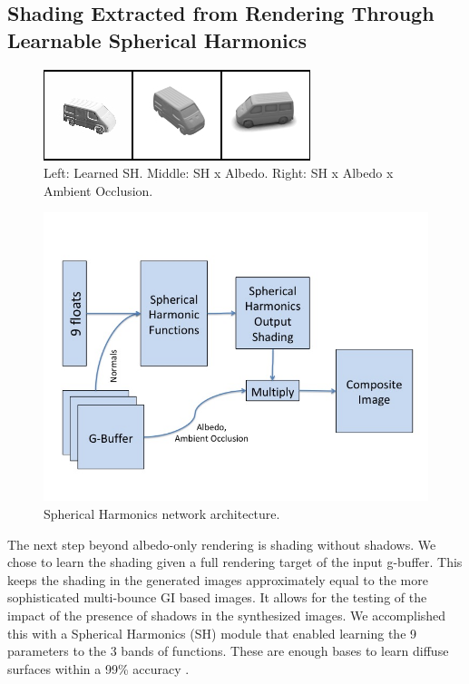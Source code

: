 \subsection{Shading Extracted from Rendering Through Learnable Spherical Harmonics}\label{sec:learned_sh}
\begin{figure}[h!]
\centering
\includegraphics[width=1.0\columnwidth]{./assets/sh-comp-onerow.png}
\caption{Left: Learned SH. Middle: SH x Albedo. Right: SH x Albedo x Ambient Occlusion.}
\label{fig:SHComparison}
\end{figure}

\begin{figure}[h!]
\centering
\includegraphics[width=1.0\columnwidth]{./assets/SH_model.jpg}
\caption{Spherical Harmonics network architecture.}
\label{fig:SHN}
\end{figure}
The next step beyond albedo-only rendering is shading without shadows. We chose to learn the shading given a full rendering target of the input g-buffer. This keeps the shading in the generated images approximately equal to the more sophisticated multi-bounce GI based images.  It allows for the testing of the impact of the presence of shadows in the synthesized images.
We accomplished this with a Spherical Harmonics (SH) module that enabled learning the 9 parameters to the 3 bands of functions.  These are enough bases to learn diffuse surfaces within a 99\% accuracy \cite{Shreiner:2013:OPG:2544032}. 


